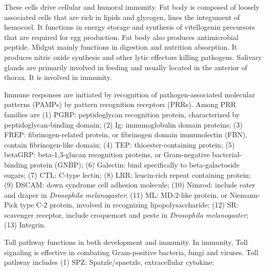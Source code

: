 \documentclass[11pt]{article}
\begin{document}
\begin{sloppypar}
These cells drive cellular and humoral immunity. 
Fat body is composed of loosely associated cells that are rich in lipids and glycogen, lines the integument of hemocoel. 
It functions in energy storage and synthesis of vitellogenin precursors that are required for egg production. 
Fat body also produces antimicrobial peptide. 
Midgut mainly functions in digestion and nutrition absorption. 
It produces nitric oxide synthesis and other lytic effectors killing pathogens. 
Salivary glands are primarily involved in feeding and usually located in the anterior of thorax. 
It is involved in immunity.
\par
Immune responses are initiated by recognition of pathogen-associated molecular patterns (PAMPs) by pattern recognition receptors (PRRs). 
Among PRR families are 
\newline
(1) PGRP: peptidoglycan recognition protein, characterized by peptidoglycan-binding domain; \newline
(2) Ig: immunoglobulin domain proteins; \newline
(3) FREP: fibrinogen-related protein, or fibrinogen domain immunolectin (FBN), contain fibrinogen-like domain; \newline
(4) TEP: thioester-containing protein; \newline
(5) betaGRP: beta-1,3-glucan recognition proteins, or Gram-negative bacterial-binding protein (GNBP); \newline
(6) Galectin: bind specifically to beta-galactoside sugars; \newline
(7) CTL: C-type lectin; \newline
(8) LRR: leucin-rich repeat containing protein; \newline
(9) DSCAM: down syndrome cell adhesion molecule; \newline
(10) Nimrod: include eater and draper in \textit{Drosophila melanogaster}; \newline
(11) ML: MD-2-like protein, or Niemann-Pick type C-2 protein, involved in recognizing lipopolysaccharide; \newline
(12) SR: scavenger receptor, include croquemort and peste in \textit{Drosophila melanogaster}; \newline
(13) Integrin.
\par
Toll pathway functions in both development and immunity. 
In immunity, Toll signaling is effective in combating Gram-positive bacteria, fungi and viruses.
Toll pathway includes
\newline
(1) SPZ: Spatzle/spaetzle, extracellular cytokine; \newline

\end{sloppypar}
\end{document}
